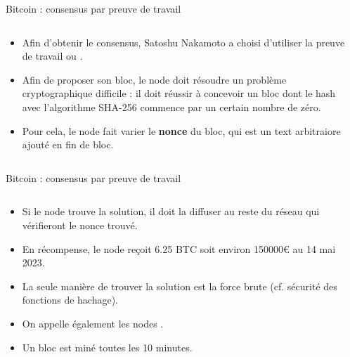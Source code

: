 \begin{frame}{Bitcoin : consensus par preuve de travail }

  \begin{columns}
    \begin{column}{0.5\textwidth}
      \begin{itemize}
        \item Afin d'obtenir le consensus, Satoshu Nakamoto a choisi d'utiliser la preuve de travail ou .
        \item Afin de proposer son bloc, le node doit résoudre un problème cryptographique difficile : il doit réussir à concevoir un bloc dont le hash avec l'algorithme SHA-256 commence par un certain nombre de zéro.
        \item Pour cela, le node fait varier le \textbf{nonce} du bloc, qui est un text arbitraiore ajouté en fin de bloc.
      \end{itemize}

    \end{column}

    \begin{column}{0.5\textwidth}
      
    \end{column}
  \end{columns}
\end{frame}

\begin{frame}{Bitcoin : consensus par preuve de travail }
  \begin{columns}
    \begin{column}{0.5\textwidth}
      \begin{itemize}
        \item Si le node trouve la solution, il doit la diffuser au reste du réseau qui vérifieront le nonce trouvé.
        \item En récompense, le node reçoit 6.25 BTC soit environ 150000€ au 14 mai 2023.
        \item La seule manière de trouver la solution est la force brute (cf. sécurité des fonctions de hachage).
        \item On appelle également les nodes .
        \item Un bloc est miné toutes les 10 minutes.
      \end{itemize}

    \end{column}

    \begin{column}{0.5\textwidth}
      
    \end{column}
  \end{columns}
\end{frame}

